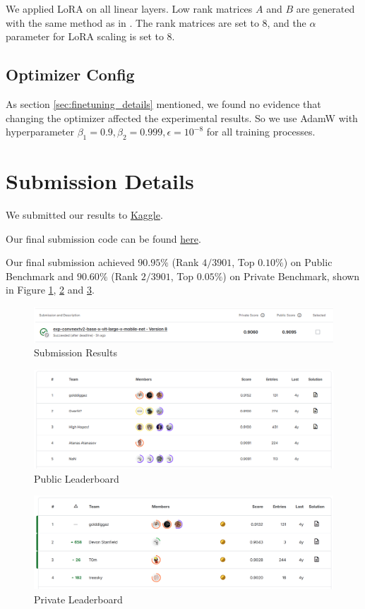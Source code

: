We applied LoRA on all linear layers. Low rank matrices $A$ and $B$ are generated with the same method as in \cite{buyukakyuz2024olora}. The rank matrices are set to $8$, and the $\alpha$ parameter for LoRA scaling is set to $8$.

\subsection{Optimizer Config}\label{appendix:optimizer_config}

As section \ref{sec:finetuning_details} mentioned, we found no evidence that changing the optimizer affected the experimental results. So we use AdamW with hyperparameter $\beta_1=0.9, \beta_2=0.999, \epsilon=10^{-8}$ for all training processes.

\section{Submission Details}\label{app:submission_details}

We submitted our results to \href{https://www.kaggle.com/competitions/cassava-leaf-disease-classification/submissions}{Kaggle}.

Our final submission code can be found \href{https://github.com/pufanyi/SC4000/blob/main/submission/final_submission.ipynb}{here}.

Our final submission achieved $90.95\%$ (Rank $4 / 3901$, Top $0.10\%$) on Public Benchmark and $90.60\%$ (Rank $2 / 3901$, Top $0.05\%$) on Private Benchmark, shown in Figure \ref{fig:submission}, \ref{fig:public_lb} and \ref{fig:private_lb}.

\begin{figure}[H]
    \centering
    \includegraphics[width=1\linewidth]{graphs/appendix/results.png}
    \caption{Submission Results}
    \label{fig:submission}
\end{figure}

\begin{figure}[H]
    \centering
    \includegraphics[width=1\linewidth]{graphs/appendix/publiclb.png}
    \caption{Public Leaderboard}
    \label{fig:public_lb}
\end{figure}

\begin{figure}[H]
    \centering
    \includegraphics[width=1\linewidth]{graphs/appendix/privatelb.png}
    \caption{Private Leaderboard}
    \label{fig:private_lb}
\end{figure}
